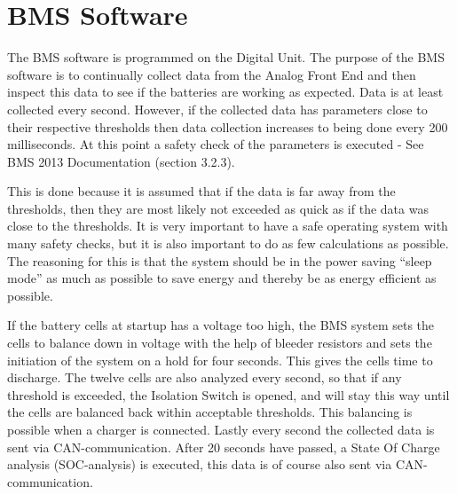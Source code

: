 \section{BMS Software}

The BMS software is programmed on the Digital Unit. The purpose of the BMS software is to continually collect data from the Analog Front End and then inspect this data to see if the batteries are working as expected. Data is at least collected every second. However, if the collected data has parameters close to their respective thresholds then data collection increases to being done every 200 milliseconds. At this point a safety check of the parameters is executed - See BMS 2013 Documentation \cite{BMSDocumentation} (section 3.2.3).

This is done because it is assumed that if the data is far away from the thresholds, then they are most likely not exceeded as quick as if the data was close to the thresholds. It is very important to have a safe operating system with many safety checks, but it is also important to do as few calculations as possible. The reasoning for this is that the system should be in the power saving “sleep mode” as much as possible to save energy and thereby be as energy efficient as possible.

If the battery cells at startup has a voltage too high, the BMS system sets the cells to balance down in voltage with the help of bleeder resistors and sets the initiation of the system on a hold for four seconds. This gives the cells time to discharge. The twelve cells are also analyzed every second, so that if any threshold is exceeded, the Isolation Switch is opened, and will stay this way until the cells are balanced back within acceptable thresholds. This balancing is possible when a charger is connected. Lastly every second the collected data is sent via CAN-communication. After 20 seconds have passed, a State Of Charge analysis (SOC-analysis) is executed, this data is of course also sent via CAN-communication.

